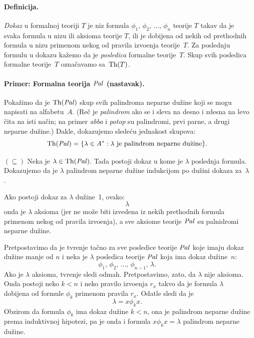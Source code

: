 \paragraph{Definicija.} \emph{Dokaz} u formalnoj teoriji $T$ je niz formula
$
  \phi_1, \, \phi_2, \, \ldots, \, \phi_n
$
teorije $T$ takav da je svaka formula u nizu ili aksioma teorije $T$, ili je dobijena od nekih od
prethodnih formula u nizu primenom nekog od pravila izvo\dj enja teorije~$T$.
Za poslednju formulu u dokazu ka\v zemo da je \emph{posledica} formalne teorije~$T$.
Skup svih posledica formalne teorije~$T$ ozna\v cavamo sa~$\mathrm{Th}(T)$.

\paragraph{Primer: Formalna teorija $\mathit{Pal}$ (nastavak).}
Poka\v zimo da je $\mathrm{Th}(\mathit{Pal})$ skup svih palindroma neparne du\v zine
koji se mogu napisati na alfabetu~$A$.
(Re\v c je \emph{palindrom} ako se i sleva na desno i zdesna na levo \v cita na isti na\v cin;
na primer \textit{abba} i \textit{potop} su palindromi, prvi parne, a drugi neparne du\v zine.)
Dakle, dokazujemo slede\'cu jednakost skupova:
$$
  \Th(\Pal) = \{ \lambda \in A^* : \lambda \text{ je palindrom neparne du\v zine}\}.
$$

$(\subseteq)$ Neka je $\lambda \in \mathrm{Th}(\mathit{Pal})$. Tada postoji dokaz u kome je $\lambda$
poslednja formula. Dokazujemo da je $\lambda$ palindrom neparne du\v zine
indukcijom po du\v zini dokaza za~$\lambda$.

Ako postoji dokaz za $\lambda$ du\v zine~1, ovako:
$$
  \lambda
$$
onda je $\lambda$ aksioma (jer ne mo\v ze biti izvedena iz nekih prethodnih formula primenom nekog od
pravila izvo\dj enja), a sve aksiome teorije $\mathit{Pal}$ su palnidromi neparne du\v zine.

Pretpostavimo da je tvr\dj enje ta\v cno za sve posledice teorije $\mathit{Pal}$ koje imaju dokaz du\v zine
manje od $n$ i neka je $\lambda$ posledica teorije $\mathit{Pal}$ koja ima dokaz du\v zine~$n$:
$$
  \phi_1, \, \phi_2, \, \ldots, \, \phi_{n-1}, \, \lambda.
$$
Ako je $\lambda$ aksioma, tvr\dj enje sledi odmah. Pretpostavimo, zato, da $\lambda$ nije aksioma.
Onda postoji neko $k < n$ i neko pravilo izvo\dj enja $r_x$ takvo da je formula $\lambda$ dobijena
od formule $\phi_k$ primenom pravila $r_x$. Odatle sledi da je
$$
  \lambda = x \phi_k x.
$$
Obzirom da formula $\phi_k$ ima dokaz du\v zine $k < n$, ona je palindrom neparne du\v zine
prema induktivnoj hipotezi, pa je onda
i formula $x \phi_k x = \lambda$ palindrom neparne du\v zine.

